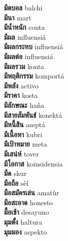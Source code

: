 \textbf{ มีตบอล  } balchi \\
\textbf{ มีนา  } mart \\
\textbf{ มีน้ำหนัก  } conta \\
\textbf{ มีผล  } influensiá \\
\textbf{ มีผลกระทบ  } influensiá \\
\textbf{ มีผลต่อ  } influensiá \\
\textbf{ มีผลรวม  } konta \\
\textbf{ มีพฤติกรรม  } komportá \\
\textbf{ มีพลัง  } activo \\
\textbf{ มีราคา  } kosta \\
\textbf{ มีลักษณะ  } haña \\
\textbf{ มีสายสัมพันธ์  } konektá \\
\textbf{ มีหนี้สิน  } aseptá \\
\textbf{ มีเนื้อหา  } kubri \\
\textbf{ มีเป้าหมาย  } meta \\
\textbf{ มีเสน่ห์  } tover \\
\textbf{ มีโอกาส  } koinsidensia \\
\textbf{ มืด  } skur \\
\textbf{ มือถือ  } sèl \\
\textbf{ มือสมัครเล่น  } amatùr \\
\textbf{ มือสะอาด  } honesto \\
\textbf{ มื้อเช้า  } desayuno \\
\textbf{ มุมตั้ง  } haltura \\
\textbf{ มุมมอง  } aspekto \\
